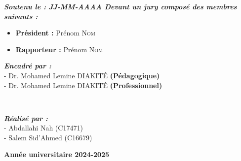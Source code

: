 \begin{titlepage}
\begin{center}
\emph{\large \bfseries Soutenu le : JJ-MM-AAAA Devant un jury composé des membres suivants :}\\
\begin{itemize}
    \item \textbf{Président :} Prénom \textsc{Nom}
    \item \textbf{Rapporteur :} Prénom \textsc{Nom}
\end{itemize}
\end{center}
\vspace{0.5cm}
\noindent
\begin{center}
    \vspace{-5mm}
    \begin{center} \large
    \emph{\textbf{Encadré par :}} \\
    - Dr. Mohamed Lemine \textsc{DIAKITÉ} \textbf{(Pédagogique)}\\[0.1cm]
    - Dr. Mohamed Lemine \textsc{DIAKITÉ}  \textbf{(Professionnel)}\\[0.1cm]
    \end{center}
\end{center}\hfill\\
\vspace{1cm}
\begin{center}
    \vspace{-5mm}
  \begin{center} \large
    \emph{\textbf{Réalisé par :}}\\
    - Abdallahi Nah (C17471) \\
    - Salem Sid’Ahmed (C16679)
  \end{center}
\end{center}\hfill

\vspace{1cm}
{\large \textbf{Année universitaire 2024-2025}}



\end{titlepage}
